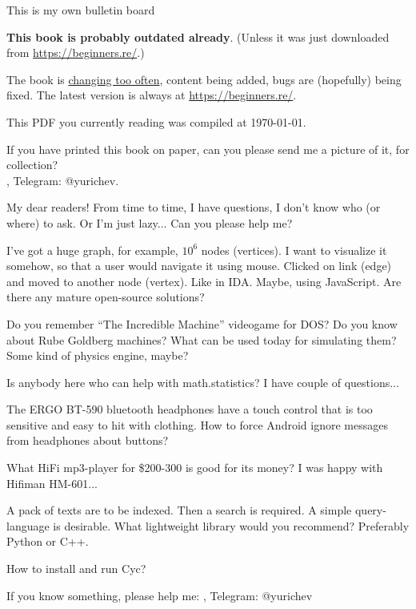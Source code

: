 
\begin{center}
\LARGE{} This is my own bulletin board \normalsize{}
\end{center}

\textbf{This book is probably outdated already}.
(Unless it was just downloaded from \url{https://beginners.re/}.)

The book is \href{\RepoURL/ChangeLog}{changing too often},
content being added, bugs are (hopefully) being fixed.
The latest version is always at \url{https://beginners.re/}.

This PDF you currently reading was compiled at \today{}.

\myhrule{}

If you have printed this book on paper, can you please send me a picture of it, for collection?\\
\EMAIL{}, Telegram: @yurichev.

\myhrule{}

My dear readers! From time to time, I have questions, I don't know who (or where) to ask.
Or I'm just lazy...
Can you please help me?

\myhrule{}

I've got a huge graph, for example, $10^6$ nodes (vertices).
I want to visualize it somehow, so that a user would navigate it using mouse.
Clicked on link (edge) and moved to another node (vertex).
Like in IDA.
Maybe, using JavaScript.
Are there any mature open-source solutions?

\myhrule{}

Do you remember ``The Incredible Machine'' videogame for DOS?
Do you know about Rube Goldberg machines?
What can be used today for simulating them?
Some kind of physics engine, maybe?

\myhrule{}

Is anybody here who can help with math.statistics? I have couple of questions...

\myhrule{}

The ERGO BT-590 bluetooth headphones have a touch control that is too sensitive and easy to hit with clothing.
How to force Android ignore messages from headphones about buttons?

\myhrule{}

What HiFi mp3-player for \$200-300 is good for its money?
I was happy with Hifiman HM-601...

\myhrule{}

A pack of texts are to be indexed. Then a search is required. A simple query-language is desirable.
What lightweight library would you recommend?
Preferably Python or C++.

\myhrule{}

How to install and run Cyc?

\myhrule{}

If you know something, please help me: \EMAIL{}, Telegram: @yurichev

